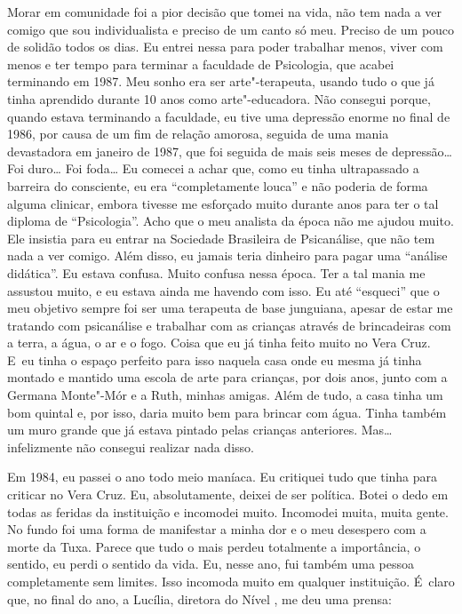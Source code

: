 Morar em comunidade foi a pior decisão que tomei na vida, não tem nada a
ver comigo que sou individualista e preciso de um canto só meu. Preciso
de um pouco de solidão todos os dias. Eu entrei nessa para poder
trabalhar menos, viver com menos e ter tempo para terminar a faculdade
de Psicologia, que acabei terminando em 1987. Meu sonho era ser
arte"-terapeuta, usando tudo o que já tinha aprendido durante 10 anos
como arte"-educadora. Não consegui porque, quando estava terminando a
faculdade, eu tive uma depressão enorme no final de 1986, por causa de
um fim de relação amorosa, seguida de uma mania devastadora em janeiro
de 1987, que foi seguida de mais seis meses de depressão… Foi
duro… Foi foda… Eu comecei a achar que, como eu tinha
ultrapassado a barreira do consciente, eu era ``completamente louca'' e
não poderia de forma alguma clinicar, embora tivesse me esforçado muito
durante anos para ter o tal diploma de ``Psicologia''. Acho que o meu
analista da época não me ajudou muito. Ele insistia para eu entrar na
Sociedade Brasileira de Psicanálise, que não tem nada a ver comigo. Além
disso, eu jamais teria dinheiro para pagar uma ``análise didática''. Eu
estava confusa. Muito confusa nessa época. Ter a tal mania me assustou
muito, e eu estava ainda me havendo com isso. Eu até ``esqueci'' que o
meu objetivo sempre foi ser uma terapeuta de base junguiana, apesar de
estar me tratando com psicanálise e trabalhar com as crianças através de
brincadeiras com a terra, a água, o ar e o fogo. Coisa que eu já tinha
feito muito no Vera Cruz. E~eu tinha o espaço perfeito para isso naquela
casa onde eu mesma já tinha montado e mantido uma escola de arte para
crianças, por dois anos, junto com a Germana Monte"-Mór e a Ruth, minhas
amigas. Além de tudo, a casa tinha um bom quintal e, por isso, daria
muito bem para brincar com água. Tinha também um muro grande que já
estava pintado pelas crianças anteriores. Mas… infelizmente não
consegui realizar nada disso.

Em 1984, eu passei o ano todo meio maníaca. Eu critiquei tudo que tinha
para criticar no Vera Cruz. Eu, absolutamente, deixei de ser política.
Botei o dedo em todas as feridas da instituição e incomodei muito.
Incomodei muita, muita gente. No fundo foi uma forma de manifestar a
minha dor e o meu desespero com a morte da Tuxa. Parece que tudo o mais
perdeu totalmente a importância, o sentido, eu perdi o sentido da vida.
Eu, nesse ano, fui também uma pessoa completamente sem limites. Isso
incomoda muito em qualquer instituição. É~claro que, no final do ano, a
Lucília, diretora do Nível , me deu uma prensa:

